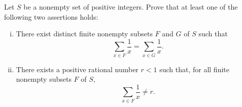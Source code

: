Let $S$ be a nonempty set of positive integers.
Prove that at least one of the following two assertions holds:
\begin{enumerate}[(i)]
    \item There exist distinct finite nonempty subsets $F$ and $G$ of $S$ such that 
    $$\sum_{x\in F}\frac{1}{x}=\sum_{x\in G}\frac{1}{x}.$$
    \item There exists a positive rational number $r<1$ such that, for all finite nonempty subsets $F$ of $S$, 
    $$\sum_{x\in F} \frac{1}{x}\neq r.$$
\end{enumerate}
